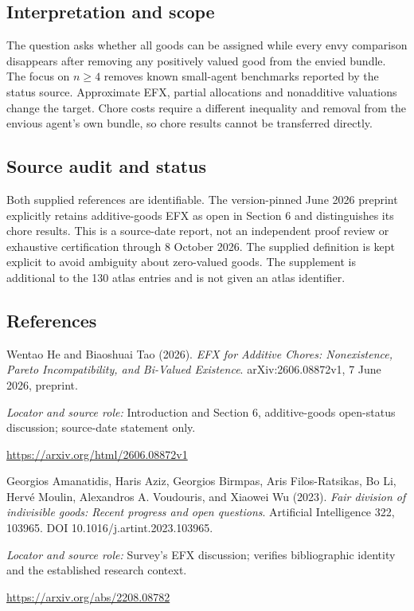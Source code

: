 \documentclass[11pt,a4paper]{article}
\begin{document}
\subsection*{Interpretation and scope}
The question asks whether all goods can be assigned while every envy comparison disappears after removing any positively valued good from the envied bundle. The focus on $n\geq4$ removes known small-agent benchmarks reported by the status source. Approximate EFX, partial allocations and nonadditive valuations change the target. Chore costs require a different inequality and removal from the envious agent's own bundle, so chore results cannot be transferred directly.
\subsection*{Source audit and status}
Both supplied references are identifiable. The version-pinned June 2026 preprint explicitly retains additive-goods EFX as open in Section 6 and distinguishes its chore results. This is a source-date report, not an independent proof review or exhaustive certification through 8 October 2026. The supplied definition is kept explicit to avoid ambiguity about zero-valued goods. The supplement is additional to the 130 atlas entries and is not given an atlas identifier.
\subsection*{References}
{\footnotesize\raggedright
\begin{enumerate}[label={\textbf{[S\arabic*]}},leftmargin=3em]
\item Wentao He and Biaoshuai Tao (2026). \emph{EFX for Additive Chores: Nonexistence, Pareto Incompatibility, and Bi-Valued Existence}. arXiv:2606.08872v1, 7 June 2026, preprint.\par
\textit{Locator and source role:} Introduction and Section 6, additive-goods open-status discussion; source-date statement only.\par
\url{https://arxiv.org/html/2606.08872v1}
\item Georgios Amanatidis, Haris Aziz, Georgios Birmpas, Aris Filos-Ratsikas, Bo Li, Hervé Moulin, Alexandros A. Voudouris, and Xiaowei Wu (2023). \emph{Fair division of indivisible goods: Recent progress and open questions}. Artificial Intelligence 322, 103965. DOI 10.1016/j.artint.2023.103965.\par
\textit{Locator and source role:} Survey's EFX discussion; verifies bibliographic identity and the established research context.\par
\url{https://arxiv.org/abs/2208.08782}
\end{enumerate}}
\end{document}
